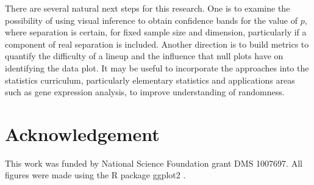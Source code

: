 There are several natural next steps for this research. One is to examine the possibility of using visual inference to obtain confidence bands for the value of $p$, where separation is certain, for fixed sample size and dimension, particularly if a component of real separation is included. Another direction is to build metrics to quantify the difficulty of a lineup and the influence that null plots have on identifying the data plot. It may be useful to incorporate the approaches into the statistics curriculum, particularly elementary statistics and applications areas such as gene expression analysis, to improve understanding of randomness. 



\section*{Acknowledgement}
%
This work was funded by National Science Foundation grant DMS 1007697. All figures were made using the R \citep{r} package ggplot2 \citep{hadley:2009}.

